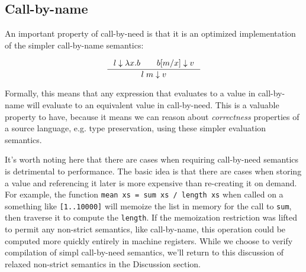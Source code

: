 \subsection{Call-by-name}
An important property of call-by-need is that it is an optimized implementation of
the simpler call-by-name semantics: 

\begin{align}
\inference{l \downarrow \lambda x. b \quad \quad b [m / x] \downarrow v}{l \; m \downarrow v}
\end{align}

Formally, this means that any expression that evaluates to a value in
call-by-name will evaluate to an equivalent value in call-by-need. This is a
valuable property to have, because it means we can reason about
\emph{correctness} properties of a source language, e.g. type preservation,
using these simpler evaluation semantics. 

It's worth noting here that there are cases when requiring call-by-need
semantics is detrimental to performance. The basic idea is that there are cases
when storing a value and referencing it later is more expensive than re-creating
it on demand. For example, the function \texttt{mean xs = sum xs / length xs}
when called on a something like \texttt{[1..10000]} will memoize the list in
memory for the call to \texttt{sum}, then traverse it to compute the
\texttt{length}.  If the memoization restriction was lifted to permit any
non-strict semantics, like call-by-name, this operation could be computed more
quickly entirely in machine registers. While we choose to verify compilation of
simpl call-by-need semantics, we'll return to this discussion of relaxed
non-strict semantics in the Discussion section.

